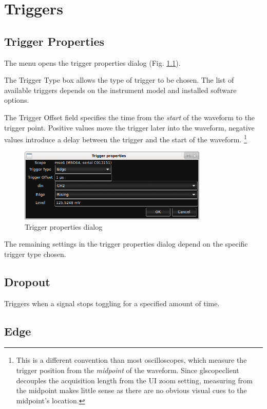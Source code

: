\chapter{Triggers}

\section{Trigger Properties}

The  menu opens the trigger properties dialog (Fig. \ref{trigger-properties}).

The Trigger Type box allows the type of trigger to be chosen. The list of available triggers depends on the instrument
model and installed software options.

The Trigger Offset field specifies the time from the \emph{start} of the waveform to the trigger point. Positive values
move the trigger later into the waveform, negative values introduce a delay between the trigger and the start of the
waveform. \footnote{This is a different convention than most oscilloscopes, which measure the trigger position from the
\emph{midpoint} of the waveform. Since glscopeclient decouples the acquisition length from the UI zoom setting,
measuring from the midpoint makes little sense as there are no obvious visual cues to the midpoint's location.}

\begin{figure}[h]
\centering
\includegraphics[width=9cm]{images/trigger-properties.png}
\caption{Trigger properties dialog}
\label{trigger-properties}
\end{figure}

The remaining settings in the trigger properties dialog depend on the specific trigger type chosen.

\section{Dropout}

Triggers when a signal stops toggling for a specified amount of time.

\section{Edge}

